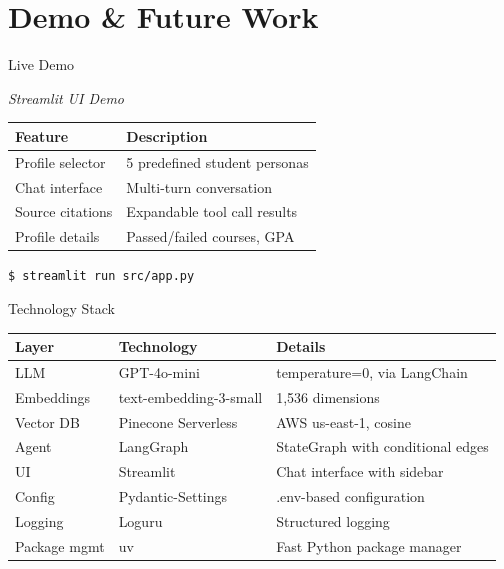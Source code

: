 \documentclass[aspectratio=169,10pt]{beamer}
\begin{document}
\section{Demo \& Future Work}

\begin{frame}{Live Demo}

\begin{center}
\Large
\textit{Streamlit UI Demo}

\vspace{1em}
\normalsize

\begin{tabular}{ll}
\toprule
\textbf{Feature} & \textbf{Description} \\
\midrule
Profile selector & 5 predefined student personas \\
Chat interface & Multi-turn conversation \\
Source citations & Expandable tool call results \\
Profile details & Passed/failed courses, GPA \\
\bottomrule
\end{tabular}

\vspace{1em}
\texttt{\$ streamlit run src/app.py}
\end{center}

\end{frame}


\begin{frame}{Technology Stack}

\begin{center}
\footnotesize
\begin{tabular}{lll}
\toprule
\textbf{Layer} & \textbf{Technology} & \textbf{Details} \\
\midrule
LLM & GPT-4o-mini & temperature=0, via LangChain \\
Embeddings & text-embedding-3-small & 1,536 dimensions \\
Vector DB & Pinecone Serverless & AWS us-east-1, cosine \\
Agent & LangGraph & StateGraph with conditional edges \\
UI & Streamlit & Chat interface with sidebar \\
Config & Pydantic-Settings & .env-based configuration \\
Logging & Loguru & Structured logging \\
Package mgmt & uv & Fast Python package manager \\
\bottomrule
\end{tabular}
\end{center}

\end{frame}
\end{document}

